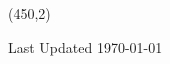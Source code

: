 \documentclass[letterpaper]{twentysecondcv} %
\begin{document}


\begin{textblock*}{5cm}(450,2) %
\color{mainblue}\fontsize{8pt}{10pt}\selectfont %
\begin{flushright}
Last Updated \today %
\end{flushright}
\end{textblock*}
\end{document}
